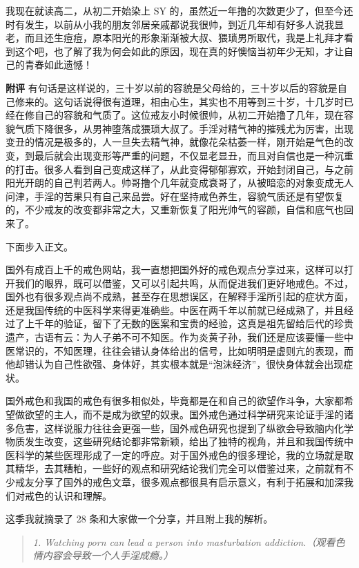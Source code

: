 \begin{case}
    我现在就读高二，从初二开始染上 SY 的，虽然近一年撸的次数更少了，但至今还时有发生，以前从小我的朋友邻居亲戚都说我很帅，到近几年却有好多人说我显老，而且还生痘痘，原本阳光的形象渐渐被大叔、猥琐男所取代，我是上礼拜才看到这个吧，也了解了我为何会如此的原因，现在真的好懊恼当初年少无知，才让自己的青春如此遗憾！

    \textbf{附评} 有句话是这样说的，三十岁以前的容貌是父母给的，三十岁以后的容貌是自己修来的。这句话说得很有道理，相由心生，其实也不用等到三十岁，十几岁时已经在修自己的容貌和气质了。这位戒友小时候很帅，从初二开始撸了几年，现在容貌气质下降很多，从男神堕落成猥琐大叔了。手淫对精气神的摧残尤为厉害，出现变丑的情况是极多的，人一旦失去精气神，就像花朵枯萎一样，刚开始是气色的改变，到最后就会出现变形等严重的问题，不仅显老显丑，而且对自信也是一种沉重的打击。很多人看到自己变成这样了，从此变得郁郁寡欢，开始封闭自己，与之前阳光开朗的自己判若两人。帅哥撸个几年就变成衰哥了，从被暗恋的对象变成无人问津，手淫的苦果只有自己来品尝。好在坚持戒色养生，容貌气质还是有望恢复的，不少戒友的改变都非常之大，又重新恢复了阳光帅气的容颜，自信和底气也回来了。
\end{case}

下面步入正文。

国外有成百上千的戒色网站，我一直想把国外好的戒色观点分享过来，这样可以打开我们的眼界，既可以借鉴，又可以引起共鸣，从而促进我们更好地戒色。不过，国外也有很多观点尚不成熟，甚至存在思想误区，在解释手淫所引起的症状方面，还是我国传统的中医科学来得更准确些。中医在两千年以前就已经成熟了，并且经过了上千年的验证，留下了无数的医案和宝贵的经验，这真是祖先留给后代的珍贵遗产，古语有云：为人子弟不可不知医。作为炎黄子孙，我们还是应该要懂一些中医常识的，不知医理，往往会错认身体给出的信号，比如明明是虚则亢的表现，而他却错认为自己性欲强、身体好，其实根本就是“泡沫经济”，很快身体就会出现症状。

国外戒色和我国的戒色有很多相似处，毕竟都是在和自己的欲望作斗争，大家都希望做欲望的主人，而不是成为欲望的奴隶。国外戒色通过科学研究来论证手淫的诸多危害，这样说服力往往会更强一些，国外戒色研究也提到了纵欲会导致脑内化学物质发生改变，这些研究结论都非常新颖，给出了独特的视角，并且和我国传统中医科学的某些医理形成了一定的呼应。对于国外戒色的很多理论，我的立场就是取其精华，去其糟粕，一些好的观点和研究结论我们完全可以借鉴过来，之前就有不少戒友分享了国外的戒色文章，很多观点都很具有启示意义，有利于拓展和加深我们对戒色的认识和理解。

这季我就摘录了 28 条和大家做一个分享，并且附上我的解析。

\begin{quote}\it
    1. Watching porn can lead a person into masturbation addiction.（观看色情内容会导致一个人手淫成瘾。）
\end{quote}

